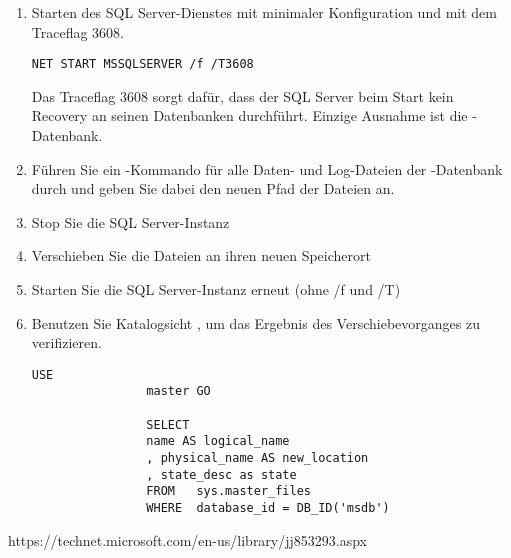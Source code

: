             \begin{enumerate}
                \item Starten des SQL Server-Dienstes mit minimaler
                Konfiguration und mit dem Traceflag 3608.
                \begin{lstlisting}[language=terminal,caption={Starten des SQL
                Server unter Umgehung des automatischen Recoveries},
                label=admin03_24]
NET START MSSQLSERVER /f /T3608
                \end{lstlisting}
                \begin{merke}
                  Das Traceflag 3608 sorgt dafür, dass der SQL Server beim Start
                  kein Recovery an seinen Datenbanken durchführt. Einzige
                  Ausnahme ist die -Datenbank.
                \end{merke}
              \item Führen Sie ein -Kommando für alle Daten- und Log-Dateien der
              -Datenbank durch und geben Sie dabei den neuen
              Pfad der Dateien an.
              \item Stop Sie die SQL Server-Instanz
              \item Verschieben Sie die Dateien an ihren neuen Speicherort
              \item Starten Sie die SQL Server-Instanz erneut (ohne /f und /T)
              \item Benutzen Sie Katalogsicht , um
              das Ergebnis des Verschiebevorganges zu verifizieren.
              
              \begin{lstlisting}[language=ms_sql,caption={Abfragen
                der View \identifier{sys.master\_files}},label=admin03_23]
                USE
                master GO

                SELECT 
                name AS logical_name
                , physical_name AS new_location
                , state_desc as state
                FROM   sys.master_files
                WHERE  database_id = DB_ID('msdb')
              \end{lstlisting}
          \end{enumerate}
            \begin{literaturinternet}
            \item \cite{ms188396}
          \end{literaturinternet}
  
  
  https://technet.microsoft.com/en-us/library/jj853293.aspx